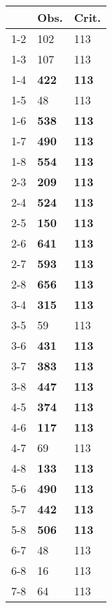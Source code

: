 \begin{table}[ht]
\centering
\begin{tabular}{rll}
  \hline
 & Obs. & Crit. \\ 
  \hline
1-2 & 102 & 113 \\ 
  1-3 & 107 & 113 \\ 
  1-4 & \textbf{422} & \textbf{113} \\ 
  1-5 & 48 & 113 \\ 
  1-6 & \textbf{538} & \textbf{113} \\ 
  1-7 & \textbf{490} & \textbf{113} \\ 
  1-8 & \textbf{554} & \textbf{113} \\ 
  2-3 & \textbf{209} & \textbf{113} \\ 
  2-4 & \textbf{524} & \textbf{113} \\ 
  2-5 & \textbf{150} & \textbf{113} \\ 
  2-6 & \textbf{641} & \textbf{113} \\ 
  2-7 & \textbf{593} & \textbf{113} \\ 
  2-8 & \textbf{656} & \textbf{113} \\ 
  3-4 & \textbf{315} & \textbf{113} \\ 
  3-5 & 59 & 113 \\ 
  3-6 & \textbf{431} & \textbf{113} \\ 
  3-7 & \textbf{383} & \textbf{113} \\ 
  3-8 & \textbf{447} & \textbf{113} \\ 
  4-5 & \textbf{374} & \textbf{113} \\ 
  4-6 & \textbf{117} & \textbf{113} \\ 
  4-7 & 69 & 113 \\ 
  4-8 & \textbf{133} & \textbf{113} \\ 
  5-6 & \textbf{490} & \textbf{113} \\ 
  5-7 & \textbf{442} & \textbf{113} \\ 
  5-8 & \textbf{506} & \textbf{113} \\ 
  6-7 & 48 & 113 \\ 
  6-8 & 16 & 113 \\ 
  7-8 & 64 & 113 \\ 
   \hline
\end{tabular}
\end{table}
